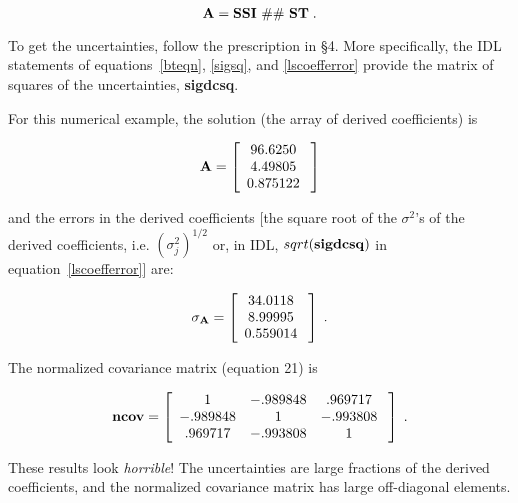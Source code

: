 \begin{equation}
{\bf A} = {\bf SSI \ \#\# \ ST} \; .
\end{equation}

	To get the uncertainties, follow the prescription in \S 4.  More
specifically, the IDL statements of equations~\ref{bteqn}, \ref{sigsq},
and \ref{lscoefferror} provide the matrix of squares of the
uncertainties, {\bf sigdcsq}. 

	For this numerical example, the solution (the array of derived
coefficients) is

\begin{mathletters}
\label{avalues}
\begin{eqnarray}
{\bf A} = \left[
\begin{array}{c}
96.6250 \\
4.49805 \\
0.875122 \\
\end{array} \; \right] 
\end{eqnarray}

\noindent and the errors in the derived coefficients [the square root of
the $\sigma^2$'s of the derived coefficients, i.e.  $(\sigma_j^2)^{1/2}$
or, in IDL, $sqrt({\bf sigdcsq})$ in equation~\ref{lscoefferror}] are:

\begin{eqnarray}
{\bf \sigma_A} = \left[
\begin{array}{c}
34.0118 \\
8.99995 \\
0.559014 \\
\end{array} \; \right] \; .
\end{eqnarray}

\noindent The normalized covariance matrix (equation 21) is

\begin{eqnarray}
{\bf ncov} = \left[
\begin{array}{ccc}
1  &  -.989848   &  .969717  \\
-.989848  &  1   &  -.993808  \\
.969717  & -.993808 &  1  \\
\end{array} \; \right] \; .
\end{eqnarray}
\end{mathletters}

	These results look {\it horrible}! The uncertainties are large
fractions of the derived coefficients, and the normalized covariance
matrix has large off-diagonal elements.  

